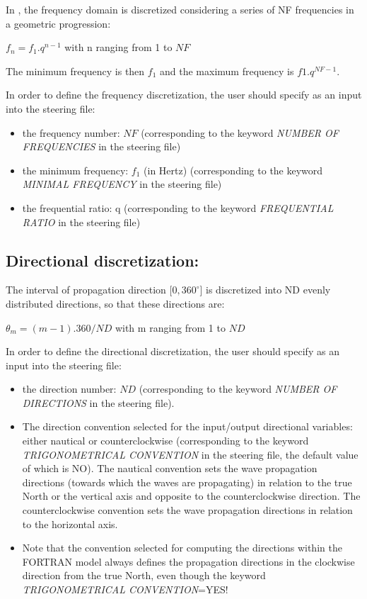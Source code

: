  In \tomawac, the frequency domain is discretized considering a series of NF frequencies in a geometric progression:

   $f_n = f_1.q^{n-1}$  with n ranging from 1 to $NF$

 The minimum frequency is then $f_1$ and the maximum frequency is $f1.q^{NF-1}.$

In order to define the frequency discretization, the user should specify as an input into the steering file:

\begin{itemize}
\item  the frequency number: $NF$ (corresponding to the keyword \textit{NUMBER OF FREQUENCIES} in the steering file)
\item  the minimum frequency: $f_1$ (in Hertz) (corresponding to the keyword \textit{MINIMAL FREQUENCY} in the steering file)
\item  the frequential ratio: q (corresponding to the keyword \textit{FREQUENTIAL RATIO} in the steering file)
\end{itemize}

\subsection{  Directional discretization:}

 The interval of propagation direction $[0, 360^\circ$] is discretized into ND evenly distributed directions, so that these directions are:

$ \theta_m = (m-1).360/ND $  with m ranging from 1 to $ND$

 In order to define the directional discretization, the user should specify as an input into the steering file:

\begin{itemize}
\item  the direction number: $ND$ (corresponding to the keyword \textit{NUMBER OF DIRECTIONS} in the steering file).
\item  The direction convention selected for the input/output directional variables: either nautical or counterclockwise (corresponding to the keyword \textit{TRIGONOMETRICAL CONVENTION} in the steering file, the default value of which is NO). The nautical convention sets the wave propagation directions (towards which the waves are propagating) in relation to the true North or the vertical axis and opposite to the counterclockwise direction. The counterclockwise convention sets the wave propagation directions in relation to the horizontal axis.
\item  Note that the convention selected for computing the directions within the FORTRAN model always defines the propagation directions in the clockwise direction from the true North, even though the keyword \textit{TRIGONOMETRICAL CONVENTION}=YES!
\end{itemize}


